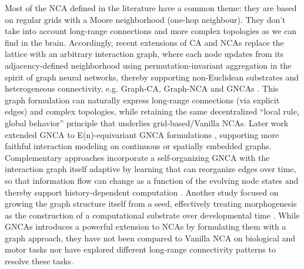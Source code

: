 \documentclass[letterpaper]{article}
\begin{document}
Most of the NCA defined in the literature have a common theme: they are based on regular grids with a Moore neighborhood (one-hop neighbour). They don't take into account long-range connections and more complex topologies as we can find in the brain. Accordingly, recent extensions of CA and NCAs replace the lattice with an arbitrary interaction graph, where each node updates from its adjacency-defined neighborhood using permutation-invariant aggregation in the spirit of graph neural networks, thereby supporting non-Euclidean substrates and heterogeneous connectivity, e.g. Graph-CA, Graph-NCA and GNCAs \cite{grattarola2021learning, gala2023n, moyo2025self}.  This graph formulation can naturally express long-range connections (via explicit edges) and complex topologies, while retaining the same decentralized “local rule, global behavior” principle that underlies grid-based/Vanilla NCAs.  Later work extended GNCA to  E(n)-equivariant GNCA formulations \cite{gala2023n}, supporting more faithful interaction modeling on continuous or spatially embedded graphs. Complementary approaches incorporate a self-organizing GNCA with the interaction graph itself adaptive by learning that can reorganize edges over time, so that information flow can change as a function of the evolving node states and thereby support history-dependent computation \cite{moyo2025self}. Another study focused on growing the graph structure itself from a seed, effectively treating morphogenesis as the construction of a computational substrate over developmental time \cite{barandiaran2025growing}. While GNCAs introduces a powerful extension to NCAs by formulating them with a graph approach, they have not been compared to Vanilla NCA on biological and motor tasks nor have explored different long-range connectivity patterns to resolve these tasks.

\end{document}
